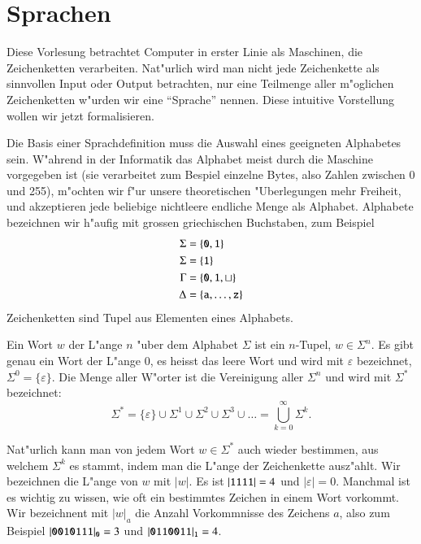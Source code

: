%
%
%
\rhead{}
\chapter{Sprachen\label{chapter-sprachen}}
Diese Vorlesung betrachtet Computer in erster Linie als
Maschinen, die Zeichenketten verarbeiten. Nat"urlich wird man
nicht jede Zeichenkette als sinnvollen Input oder Output betrachten,
nur eine Teilmenge aller m"oglichen Zeichenketten w"urden wir
eine ``Sprache'' nennen. Diese intuitive Vorstellung wollen wir
jetzt formalisieren.

Die Basis einer Sprachdefinition muss die Auswahl eines geeigneten
Alphabetes sein. W"ahrend in der Informatik das Alphabet meist 
durch die Maschine vorgegeben ist (sie verarbeitet zum Bespiel
einzelne Bytes, also Zahlen zwischen 0 und 255), m"ochten wir f"ur
unsere theoretischen "Uberlegungen mehr Freiheit, und akzeptieren
jede beliebige nichtleere endliche Menge als Alphabet. Alphabete
bezeichnen wir h"aufig mit grossen griechischen Buchstaben, zum
Beispiel
\begin{align*}
\Sigma&=\{{\tt 0},{\tt 1}\}\\
\Sigma&=\{{\tt 1}\}\\
\Gamma&=\{{\tt 0},{\tt 1},\sqcup\}\\
\Delta&=\{{\tt a},\dots,{\tt z}\}
\end{align*}
Zeichenketten sind Tupel aus Elementen eines Alphabets.
\begin{definition}\label{def_wort}
Ein Wort $w$ der L"ange $n$ "uber dem Alphabet $\Sigma$ ist ein $n$-Tupel,
$w\in\Sigma^n$. Es gibt genau ein Wort der L"ange $0$, es heisst das
leere Wort und wird mit $\varepsilon$ bezeichnet, $\Sigma^0=\{\varepsilon\}$.
Die Menge aller W"orter
ist die Vereinigung aller $\Sigma^n$ und wird mit $\Sigma^*$ bezeichnet:
\[
\Sigma^*=\{\varepsilon\}\cup \Sigma^1\cup\Sigma^2\cup\Sigma^3\cup\dots
=\bigcup_{k=0}^\infty\Sigma^k.
\]
\end{definition}

Nat"urlich kann man von jedem Wort $w\in\Sigma^*$ auch wieder bestimmen,
aus welchem $\Sigma^k$ es stammt, indem man die L"ange der Zeichenkette
ausz"ahlt. Wir bezeichnen die L"ange von $w$ mit $|w|$. Es ist $|{\tt 1111}|=4$
und $|\varepsilon|=0$. Manchmal ist es wichtig zu wissen, wie oft ein bestimmtes
Zeichen in einem Wort vorkommt. Wir bezeichnent mit
$|w|_{a}$ die Anzahl Vorkommnisse des Zeichens $a$, also zum Beispiel
$|{\tt 0010111}|_{\tt 0}=3$ und $|{\tt 0110011}|_{\tt 1}=4$.


